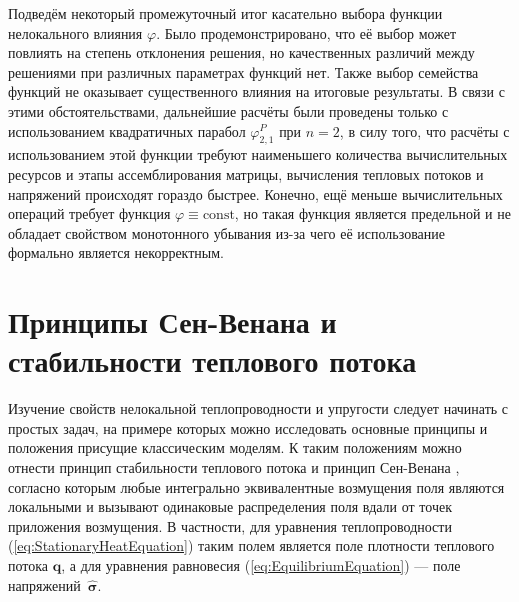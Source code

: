 Подведём некоторый промежуточный итог касательно выбора функции нелокального влияния $\varphi$. Было продемонстрировано, что её выбор может повлиять на степень отклонения решения, но качественных различий между решениями при различных параметрах функций нет. Также выбор семейства функций не оказывает существенного влияния на итоговые результаты. В связи с этими обстоятельствами, дальнейшие расчёты были проведены только с использованием квадратичных парабол $\varphi_{2,1}^P$ при $n = 2$, в силу того, что расчёты с использованием этой функции требуют наименьшего количества вычислительных ресурсов и этапы ассемблирования матрицы, вычисления тепловых потоков и напряжений происходят гораздо быстрее. Конечно, ещё меньше вычислительных операций требует функция $\varphi \equiv \text{const}$, но такая функция является предельной и не обладает свойством монотонного убывания из-за чего её использование формально является некорректным.

\section{Принципы Сен-Венана и стабильности теплового потока}\label{sec:ResultsAnalysis/SaintVenant}

Изучение свойств нелокальной теплопроводности и упругости следует начинать с простых задач, на примере которых можно исследовать основные принципы и положения присущие классическим моделям. К таким положениям можно отнести принцип стабильности теплового потока \cite{ThermalStability} и принцип Сен-Венана \cite{SaintVenant}, согласно которым любые интегрально эквивалентные возмущения поля являются локальными и вызывают одинаковые распределения поля вдали от точек приложения возмущения. В частности, для уравнения теплопроводности (\ref{eq:StationaryHeatEquation}) таким полем является поле плотности теплового потока $\boldsymbol{q}$, а для уравнения равновесия (\ref{eq:EquilibriumEquation}) --- поле \mbox{напряжений $\widehat{\boldsymbol{\sigma}}$.}

